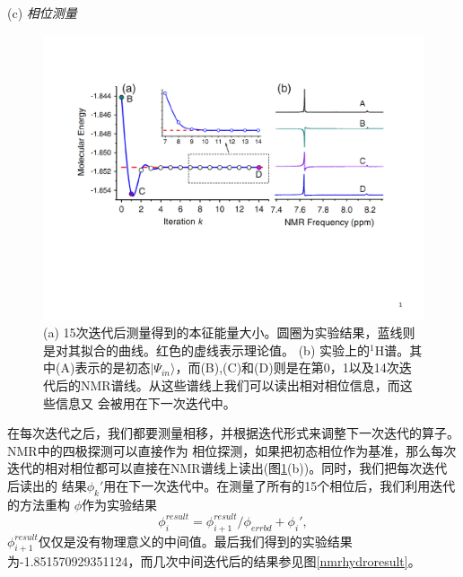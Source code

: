 (c) \emph{相位测量}

\begin{figure}[htbp]
            \begin{center}
              \includegraphics[width= 0.8\columnwidth]{figures/nmrphase.pdf}
              \caption{(a) 15次迭代后测量得到的本征能量大小。圆圈为实验结果，蓝线则是对其拟合的曲线。红色的虚线表示理论值。
              (b) 实验上的$^1$H谱。其中(A)表示的是初态$|\Psi_{in}\rangle$，而(B),(C)和(D)则是在第0，1以及14次迭代后的NMR谱线。从这些谱线上我们可以读出相对相位信息，而这些信息又
              会被用在下一次迭代中。}\label{nmrphase}
            \end{center}
 \end{figure}

在每次迭代之后，我们都要测量相移，并根据迭代形式来调整下一次迭代的算子。NMR中的四极探测可以直接作为
相位探测，如果把初态相位作为基准，那么每次迭代的相对相位都可以直接在NMR谱线上读出(图\ref{nmrphase}(b))。同时，我们把每次迭代后读出的
结果$\phi_k'$用在下一次迭代中。在测量了所有的15个相位后，我们利用迭代的方法重构 $\phi$作为实验结果
\begin{equation}
\phi_i^{result} = \phi_{i+1}^{result}/\phi_{errbd}+\phi_i',
\end{equation}
$\phi_{i+1}^{result}$仅仅是没有物理意义的中间值。最后我们得到的实验结果为-1.851570929351124，而几次中间迭代后的结果参见图\ref{nmrhydroresult}。

